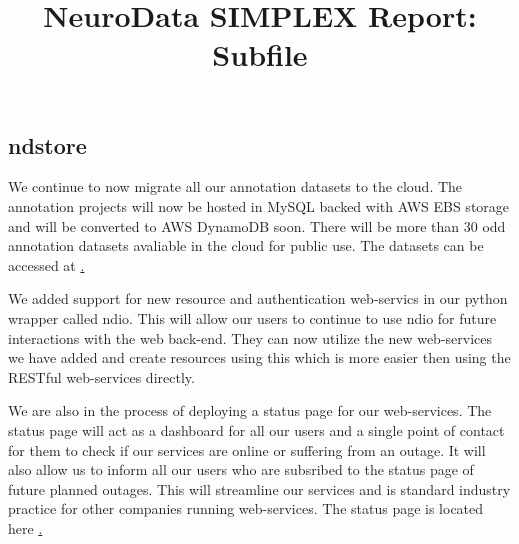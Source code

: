 \documentclass[simplex.tex]{subfiles}
\title{NeuroData SIMPLEX Report: Subfile}
\begin{document}

\subsection{ndstore}

We continue to now migrate all our annotation datasets to the cloud. The annotation projects will now be hosted in MySQL backed with AWS EBS storage and will be converted to AWS DynamoDB soon. There will be more than 30 odd annotation datasets avaliable in the cloud for public use. The datasets can be accessed at \href{http://neurodata.io}.

We added support for new resource and authentication web-servics in our python wrapper called ndio. This will allow our users to continue to use ndio for future interactions with the web back-end. They can now utilize the new web-services we have added and create resources using this which is more easier then using the RESTful web-services directly.

We are also in the process of deploying a status page for our web-services. The status page will act as a dashboard for all our users and a single point of contact for them to check if our services are online or suffering from an outage. It will also allow us to inform all our users who are subsribed to the status page of future planned outages. This will streamline our services and is standard industry practice for other companies running web-services. The status page is located here \href{https://neurodata.statuspage.io/}.
\end{document}
